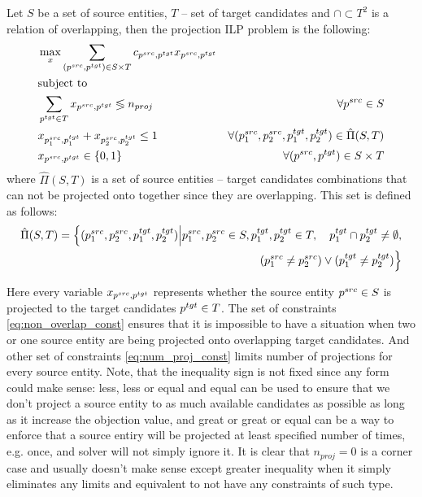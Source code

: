 Let \( S \) be a set of source entities, \( T \) -- set of target candidates and \( \cap \subset T^2 \) is
a relation of overlapping, then the projection ILP problem is the following:
\begin{align}
    \label{eq:objective}
     & \max\limits_x \sum\limits_{(p^{src}, p^{tgt}) \in S \times T} c_{p^{src}, p^{tgt}} x_{p^{src}, p^{tgt}}                                                                            \\
     & \text{subject to} \notag                                                                                                                                                           \\
    \label{eq:num_proj_const}
     & \sum\limits_{p^{tgt} \in T} x_{p^{src}, p^{tgt}} \lessgtr n_{proj}                                      & \forall p^{src} \in S                                                    \\
    \label{eq:non_overlap_const}
     & x_{p_1^{src}, p_1^{tgt}} + x_{p_2^{src}, p_2^{tgt}} \leq 1                                              & \forall (p_1^{src}, p_2^{src}, p_1^{tgt}, p_2^{tgt}) \in \hat{\Pi}(S, T) \\
    \label{eq:binary_prog}
     & x_{p^{src}, p^{tgt}} \in \{ 0, 1 \}                                                                     & \forall (p^{src}, p^{tgt}) \in S \times T
\end{align}
where \( \hat{\Pi}(S, T) \) is a set of source entities -- target candidates combinations that can not be
projected onto together since they are overlapping. This set is defined as follows:
\begin{align} \label{eq:overlapping_set}
    \hat{\Pi}(S, T) = \Big\{ (p_1^{src}, p_2^{src}, p_1^{tgt}, p_2^{tgt}) \Big| p_1^{src}, p_2^{src} \in S, p_1^{tgt}, p_2^{tgt} \in T, \quad p_1^{tgt} \cap p_2^{tgt} \neq \emptyset, \\
    (p_1^{src} \neq p_2^{src}) \lor (p_1^{tgt} \neq p_2^{tgt}) \Big\}
\end{align}

Here every variable \( x_{p^{src}, p^{tgt}} \) represents whether the source entity \( p^{src} \in S \)
is projected to the target candidates \( p^{tgt} \in T \).
The set of constraints \eqref{eq:non_overlap_const} ensures that it is impossible to have a situation when
two or one source entity are being projected onto overlapping target candidates.
And other set of constraints \eqref{eq:num_proj_const} limits number of projections
for every source entity. Note, that the inequality sign is not fixed since any form
could make sense: less, less or equal and equal can be used to ensure that we don't
project a source entity to as much available candidates as possible as long as it
increase the objection value, and great or great or equal can be a way to enforce
that a source entiry will be projected at least specified number of times, e.g. once,
and solver will not simply ignore it. It is clear that \( n_{proj} = 0 \) is a corner
case and usually doesn't make sense except greater inequality when it simply
eliminates any limits and equivalent to not have any constraints of such type.

